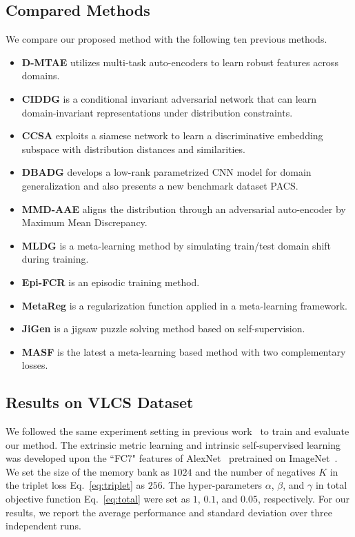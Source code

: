 \subsection{Compared Methods}
We compare our proposed method with the following ten previous methods.
\begin{itemize}
	\item \textbf{D-MTAE} \cite{ghifary2015domain} utilizes multi-task auto-encoders to learn robust features across domains.
	\item \textbf{CIDDG} \cite{li2018deep} is a conditional invariant adversarial network that can learn domain-invariant representations under distribution constraints.
	\item \textbf{CCSA} \cite{motiian2017unified} exploits
	a siamese network to learn a discriminative embedding subspace with distribution distances and similarities.
	\item \textbf{DBADG} \cite{li2017deeper} develops a low-rank parametrized CNN model for domain generalization and also presents a new benchmark dataset PACS.
	\item \textbf{MMD-AAE} \cite{li2018domain} aligns the distribution through an adversarial auto-encoder by Maximum Mean
	Discrepancy.
	\item \textbf{MLDG} \cite{li2018learning} is a meta-learning method by simulating train/test domain shift during training.
	\item \textbf{Epi-FCR} \cite{li2019episodic} is an episodic training method.
	\item \textbf{MetaReg} \cite{balaji2018metareg} is a regularization function applied in a meta-learning framework.
	\item \textbf{JiGen} \cite{carlucci2019domain} is a jigsaw puzzle solving method based on self-supervision. 
	\item \textbf{MASF} \cite{dou2019domain} is the latest a meta-learning based method with two complementary losses.
\end{itemize}
\fi 

\subsection{Results on VLCS Dataset}
We followed the same experiment setting in previous work~\cite{carlucci2019domain} to train and evaluate our method.
The extrinsic metric learning and intrinsic self-supervised learning was developed upon the ``FC7" features of AlexNet~\cite{NIPS2012_4824} pretrained on ImageNet~\cite{deng2009imagenet}.
We set the size of the memory bank as $1024$ and the number of negatives $K$ in the triplet loss Eq.~\eqref{eq:triplet} as $256$.
The hyper-parameters $\alpha$, $\beta$, and $\gamma$ in total objective function Eq.~\eqref{eq:total} were set as $1$, $0.1$, and $0.05$, respectively.
For our results, we report the average performance and standard deviation over three independent runs.


